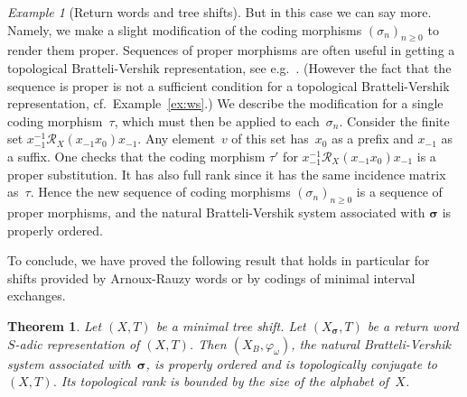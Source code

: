 \documentclass{amsart}
\newtheorem{theorem}[lemma]{Theorem}
\theoremstyle{definition}
\theoremstyle{remark}
\newtheorem{example}[lemma]{Example}
\numberwithin{equation}{section}
\begin{document}
\begin{example}[Return words and tree shifts]
But in this case we can say more. 
Namely, we make a slight modification of the coding morphisms $(\sigma_n)_{n\geq 0}$ to render them proper. 
Sequences of proper morphisms are often useful in getting a topological Bratteli-Vershik representation, see e.g.\ \cite{Durand-Host-Skau,Durand-Leroy:2012}.
(However the fact that the sequence is proper is not a sufficient condition for a topological Bratteli-Vershik representation, cf.\ Example~\ref{ex:ws}.)
We describe the modification for a single coding morphism~$\tau$, which must then be applied to each~$\sigma_n$.
Consider the finite set $x_{-1}^{-1} \mathcal{R}_X(x_{-1} x_0)x_{-1}$.  
Any element~$v$ of this set has~$x_0$ as a prefix and $x_{-1}$ as a suffix. 
One checks that the coding morphism $\tau'$ for $ x_{-1} ^{-1} \mathcal{R}_X(x_{-1} x_0)x_{-1}$
is a proper substitution. 
It has also full rank since it has the same incidence matrix as~$\tau$. 
Hence the new sequence of coding morphisms $(\sigma_n)_{n\geq 0}$ is a sequence of proper morphisms, and the natural Bratteli-Vershik system associated with $\boldsymbol{\sigma}$ is properly ordered. 
\end{example}

To conclude, we have proved the following result that holds in particular for shifts  provided by  Arnoux-Rauzy  words or by codings of minimal interval exchanges.

\begin{theorem}\label{tree-topological-BV-rep}
Let $(X,T)$ be a minimal tree shift. 
Let $(X_{\boldsymbol{\sigma}},T)$ be a return word $S$-adic representation of $(X,T)$. 
Then $(X_B,\varphi_\omega)$, the natural Bratteli-Vershik system associated with~$\boldsymbol{\sigma}$, is properly ordered and is topologically conjugate to $(X,T)$. 
Its topological rank is bounded by the size of the alphabet of~$X$.
\end{theorem}
\end{document}
